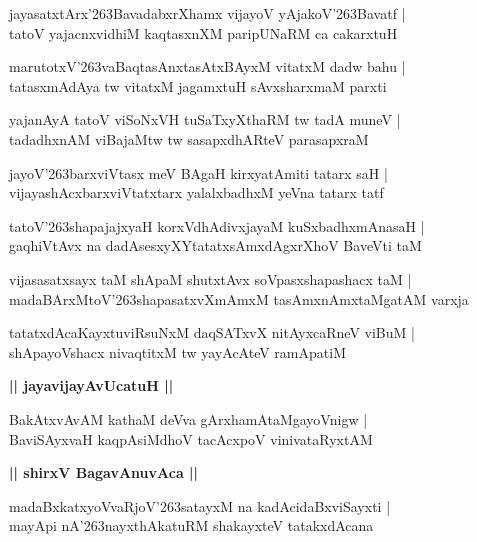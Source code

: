 \documentclass[twoside,12pt,openright]{book}
\def\S{\char'263}
\newcounter{shloka}[chapter]
\def\uvaca#1{\centerline{{\large\textbf{#1}}}}
\begin{document}
\begin{shloka}%
jayasatxtArx\S BavadabxrXhamx vijayoV yAjakoV\S Bavatf |\\
tatoV yajacnxvidhiM kaqtasxnXM paripUNaRM ca cakarxtuH 
\end{shloka}

\begin{shloka}%
marutotxV\S vaBaqtasAnxtasAtxBAyxM vitatxM dadw bahu |\\
tatasxmAdAya tw vitatxM jagamxtuH sAvxsharxmaM parxti 
\end{shloka}

\begin{shloka}%
yajanAyA tatoV viSoNxVH tuSaTxyXthaRM tw tadA muneV |\\
tadadhxnAM viBajaMtw tw sasapxdhARteV parasapxraM 
\end{shloka}

\begin{shloka}%
jayoV\S barxviVtasx meV BAgaH kirxyatAmiti tatarx saH |\\
vijayashAcxbarxviVtatxtarx yalalxbadhxM yeVna tatarx tatf
\end{shloka}

\begin{shloka}%
tatoV\S shapajajxyaH korxVdhAdivxjayaM kuSxbadhxmAnasaH |\\
gaqhiVtAvx na dadAsesxyXYtatatxsAmxdAgxrXhoV BaveVti taM
\end{shloka}

\begin{shloka}%
vijasasatxsayx taM  shApaM shutxtAvx soVpasxshapashacx taM |\\
madaBArxMtoV\S shapasatxvXmAmxM tasAmxnAmxtaMgatAM varxja 
\end{shloka}

\begin{shloka}%
tatatxdAcaKayxtuviRsuNxM daqSATxvX nitAyxcaRneV viBuM |\\
shApayoVshacx nivaqtitxM tw yayAcAteV ramApatiM 
\end{shloka}

\uvaca{|| jayavijayAvUcatuH ||}

\begin{shloka}%
BakAtxvAvAM kathaM deVva gArxhamAtaMgayoVnigw |\\
BaviSAyxvaH kaqpAsiMdhoV tacAcxpoV vinivataRyxtAM 
\end{shloka}

\uvaca{|| shirxV BagavAnuvAca ||}

\begin{shloka}%
madaBxkatxyoVvaRjoV\S satayxM na kadAcidaBxviSayxti |\\
mayApi nA\S nayxthAkatuRM shakayxteV tatakxdAcana 
\end{shloka}
\end{document}
